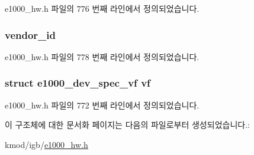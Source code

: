 e1000\+\_\+hw.\+h 파일의 776 번째 라인에서 정의되었습니다.

\subsubsection[{\texorpdfstring{vendor\+\_\+id}{vendor_id}}]{ vendor\+\_\+id}\hypertarget{structe1000__hw_a80302a87767931f95dfc264df7d0d253}{}\label{structe1000__hw_a80302a87767931f95dfc264df7d0d253}


e1000\+\_\+hw.\+h 파일의 778 번째 라인에서 정의되었습니다.

\subsubsection[{\texorpdfstring{vf}{vf}}]{\setlength{\rightskip}{0pt plus 5cm}struct {\bf e1000\+\_\+dev\+\_\+spec\+\_\+vf} vf}\hypertarget{structe1000__hw_a8900f357e8e40da8e0422aa25bda6cad}{}\label{structe1000__hw_a8900f357e8e40da8e0422aa25bda6cad}


e1000\+\_\+hw.\+h 파일의 772 번째 라인에서 정의되었습니다.



이 구조체에 대한 문서화 페이지는 다음의 파일로부터 생성되었습니다.\+:\begin{DoxyCompactItemize}
\item 
kmod/igb/\hyperlink{kmod_2igb_2e1000__hw_8h}{e1000\+\_\+hw.\+h}\end{DoxyCompactItemize}
